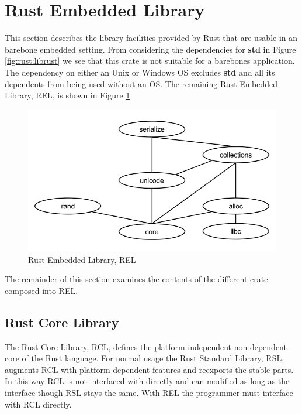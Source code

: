 \section{Rust Embedded Library}

This section describes the library facilities provided by Rust that are usable in an barebone embedded setting.
From considering the dependencies for \textbf{std} in Figure \ref{fig:rust:librust} we see that this crate is not suitable for a barebones application.
The dependency on either an Unix or Windows OS excludes \textbf{std} and all its dependents from being used without an OS.
The remaining Rust Embedded Library, REL, is shown in Figure \ref{fig:rust:rel}.

\begin{figure}[H]
  \begin{center}
    \includegraphics[scale=0.3]{figures/background/rust/embedded-rust-lib.png}
  \end{center}
  \caption{Rust Embedded Library, REL}
  \label{fig:rust:rel}
\end{figure}

The remainder of this section examines the contents of the different crate composed into REL.

\subsection{Rust Core Library}

The Rust Core Library, RCL, defines the platform independent non-dependent core of the Rust language.
For normal usage the Rust Standard Library, RSL, augments RCL with platform dependent features and reexports the stable parts.
In this way RCL is not interfaced with directly and can modified as long as the interface though RSL stays the same.
With REL the programmer must interface with RCL directly.

